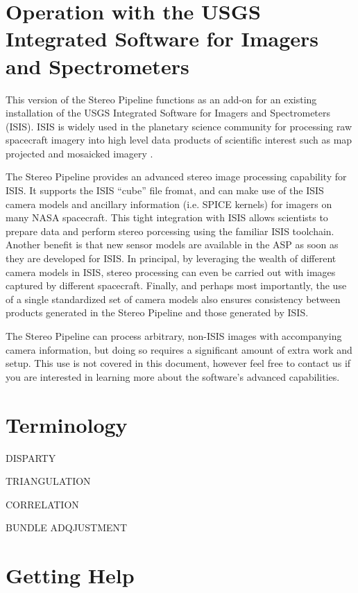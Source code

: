 \section{Operation with the USGS Integrated Software for Imagers and Spectrometers}

This version of the Stereo Pipeline functions as an add-on for an
existing installation of the USGS Integrated Software for Imagers and
Spectrometers (ISIS).  ISIS is widely used in the planetary science
community for processing raw spacecraft imagery into high level data
products of scientific interest such as map projected and mosaicked
imagery \cite{2004LPI....35.2039A, 1997LPI....28..387G, ISIS_website}.

The Stereo Pipeline provides an advanced stereo image processing
capability for ISIS.  It supports the ISIS ``cube'' file fromat, and
can make use of the ISIS camera models and ancillary information
(i.e. SPICE kernels) for imagers on many NASA spacecraft.  This tight
integration with ISIS allows scientists to prepare data and perform
stereo porcessing using the familiar ISIS toolchain.  Another benefit
is that new sensor models are available in the ASP as soon as they are
developed for ISIS.  In principal, by leveraging the wealth of
different camera models in ISIS, stereo processing can even be carried
out with images captured by different spacecraft.  Finally, and
perhaps most importantly, the use of a single standardized set of
camera models also ensures consistency between products generated in
the Stereo Pipeline and those generated by ISIS.

The Stereo Pipeline can process arbitrary, non-ISIS images with
accompanying camera information, but doing so requires a significant
amount of extra work and setup.  This use is not covered in this
document, however feel free to contact us if you are interested in
learning more about the software's advanced capabilities.

\section{Terminology}

DISPARTY

TRIANGULATION

CORRELATION

BUNDLE ADQJUSTMENT

\section{Getting Help}


